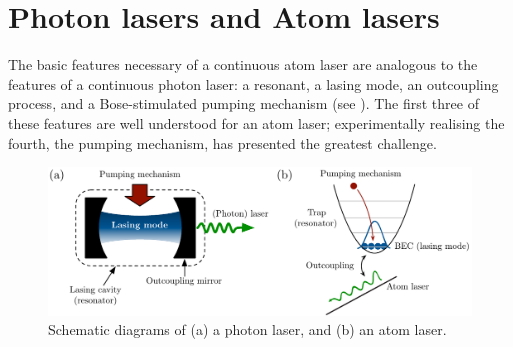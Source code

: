 

\section{Photon lasers and Atom lasers}
\label{Introduction:PhotonAndAtomLasers}

The basic features necessary of a continuous atom laser are analogous to the features of a continuous photon laser: a resonant, a lasing mode, an outcoupling process, and a Bose-stimulated pumping mechanism (see ).  The first three of these features are well understood for an atom laser; experimentally realising the fourth, the pumping mechanism, has presented the greatest challenge.

\begin{figure}
    \centering
    \includegraphics[width=14cm]{LaserAtomLaserComparison}
    \caption{
        \label{Introduction:LaserAtomLaserComparison}
        Schematic diagrams of (a) a photon laser, and (b) an atom laser.
    }
\end{figure}

